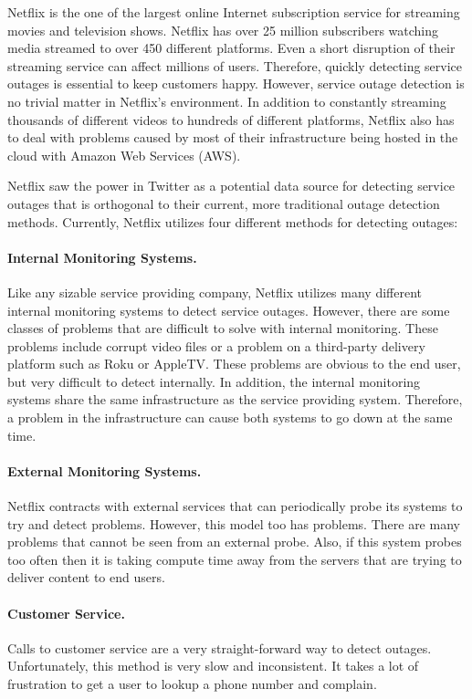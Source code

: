 \documentclass[12pt]{ucthesis}
\begin{document}
Netflix is the one of the largest online Internet subscription service for streaming movies and
television shows. Netflix has over 25 million subscribers watching media streamed to over 450 different
platforms. Even a short disruption of their streaming service can affect millions of users. Therefore, quickly detecting service outages
is essential to keep customers happy. However, service outage detection is no trivial matter in Netflix's
environment. In addition to constantly streaming thousands of different videos to hundreds of different platforms,
Netflix also has to deal with problems caused by most of their infrastructure being hosted in the cloud with
Amazon Web Services (AWS).

Netflix saw the power in Twitter as a potential data source for detecting service outages that
is orthogonal to their current, more traditional outage detection methods. Currently, Netflix utilizes four
different methods for detecting outages:

\paragraph{Internal Monitoring Systems.}
Like any sizable service providing company, Netflix utilizes many different internal monitoring
systems to detect service outages. However, there are some classes of problems that are difficult to solve
with internal monitoring. These problems include corrupt video files or a problem on a third-party delivery
platform such as Roku or AppleTV. These problems are obvious to the end user, but very difficult to detect internally.
In addition, the internal monitoring systems share the same infrastructure as the service providing system. Therefore,
a problem in the infrastructure can cause both systems to go down at the same time.

\paragraph{External Monitoring Systems.}
Netflix contracts with external services that can periodically probe its systems to try and detect problems.
However, this model too has problems. There are many problems that cannot be seen from an external probe.
Also, if this system probes too often then it is taking compute time away from the servers that are trying to deliver
content to end users.

\paragraph{Customer Service.}
Calls to customer service are a very straight-forward way to detect outages.
Unfortunately, this method is very slow and inconsistent. It takes a lot of frustration to get a user to
lookup a phone number and complain.
\end{document}
